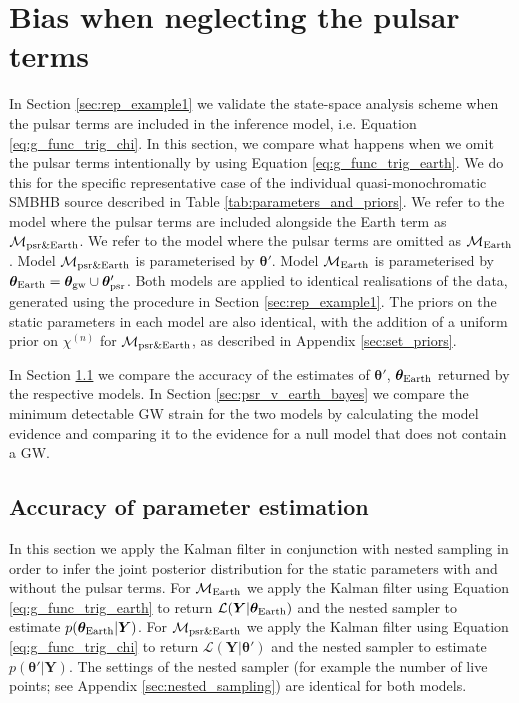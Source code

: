 \documentclass[fleqn,usenatbib,useAMS]{mnras}
\begin{document}
	

\section{Bias when neglecting the pulsar terms}\label{sec:earth_vs_psr}
In Section \ref{sec:rep_example1} we validate the state-space analysis scheme when the pulsar terms are included in the inference model, i.e. Equation \eqref{eq:g_func_trig_chi}. In this section, we compare what happens when we omit the pulsar terms intentionally by using Equation \eqref{eq:g_func_trig_earth}. We do this for the specific representative case of the individual quasi-monochromatic SMBHB source described in Table \ref{tab:parameters_and_priors}. We refer to the model where the pulsar terms are included alongside the Earth term as $\mathcal{M}_{\rm psr \& Earth}$. We refer to the model where the pulsar terms are omitted as 
$\mathcal{M}_{\rm Earth}$. Model $\mathcal{M}_{\rm psr \& Earth}$ is parameterised by $\boldsymbol{\theta}'$. Model $\mathcal{M}_{\rm Earth}$ is parameterised by $\boldsymbol{\theta}_{\rm Earth} = \boldsymbol{\theta}_{\rm gw} \cup \boldsymbol{\theta}'_{\rm psr}$. Both models are applied to identical realisations of the data, generated using the procedure in Section  \ref{sec:rep_example1}. The priors on the static parameters in each model are also identical, with the addition of a uniform prior on $\chi^{(n)}$ for $\mathcal{M}_{\rm psr \& Earth}$, as described in Appendix \ref{sec:set_priors}. \newline 


In Section \ref{sec:psr_v_earth_pe} we compare the accuracy of the estimates of $\boldsymbol{\theta'}$, $\boldsymbol{\theta}_{\rm Earth}$ returned by the respective models. In Section \ref{sec:psr_v_earth_bayes} we compare the minimum detectable GW strain for the two models by calculating the model evidence and comparing it to the evidence for a null model that does not contain a GW.

\subsection{Accuracy of parameter estimation}\label{sec:psr_v_earth_pe}

In this section we apply the Kalman filter in conjunction with nested sampling in order to infer the joint posterior distribution for the static parameters with and without the pulsar terms. For $\mathcal{M}_{\rm Earth}$ we apply the Kalman filter using Equation \eqref{eq:g_func_trig_earth} to return $\mathcal{L}(\boldsymbol{Y}| \boldsymbol{\theta}_{\rm Earth})$ and the nested sampler to estimate $p(\boldsymbol{\theta}_{\rm Earth} | \boldsymbol{Y})$. For $\mathcal{M}_{\rm psr \& Earth}$ we apply the Kalman filter using Equation \eqref{eq:g_func_trig_chi} to return $\mathcal{L}(\boldsymbol{Y}| \boldsymbol{\theta}')$ and the nested sampler to estimate $p(\boldsymbol{\theta'} | \boldsymbol{Y})$. The settings of the nested sampler (for example the number of live points; see Appendix \ref{sec:nested_sampling}) are identical for both models. \newline 
\end{document}
